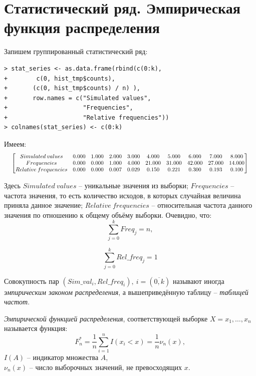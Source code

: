 \documentclass[14pt,a4paper]{scrartcl}
\begin{document}
\section{Статистический ряд. Эмпирическая функция распределения}
Запишем группированный статистический ряд:
\begin{lstlisting}
> stat_series <- as.data.frame(rbind(c(0:k), 
+        c(0, hist_tmp$counts), 
+       (c(0, hist_tmp$counts) / n) ), 
+       row.names = c("Simulated values", 
+                     "Frequencies", 
+                     "Relative frequencies"))
> colnames(stat_series) <- c(0:k)
\end{lstlisting}
Имеем:
\begin{equation*}
\resizebox{.98\hsize}{!}{$
	\begin{bmatrix}{}
	Simulated \: values & 0.000 & 1.000 & 2.000 & 3.000 & 4.000 & 5.000 & 6.000 & 7.000 & 8.000 \\ 
	Frequencies & 0.000 & 0.000 & 1.000 & 4.000 & 21.000 & 31.000 & 42.000 & 27.000 & 14.000 \\ 
	Relative \: frequencies & 0.000 & 0.000 & 0.007 & 0.029 & 0.150 & 0.221 & 0.300 & 0.193 & 0.100 \\ 
	\end{bmatrix}
$}
\end{equation*}

Здесь $Simulated \: values$ -- уникальные значения из выборки; $Frequencies$ -- частота значения, то есть количество исходов, в которых случайная величина приняла данное значение; $Relative \: frequencies$ -- относительная частота данного значения по отношению к общему объёму выборки. Очевидно, что:
\begin{equation*}
	\sum_{j = 0}^{k} Freq_j = n,
\end{equation*}

\begin{equation*}
	\sum_{j = 0}^{k} Rel\_freq_j = 1
\end{equation*}

Совокупность пар $(Sim\_val_i, Rel\_freq_i), \: i=(\overline{0, k})$ называют иногда \textit{эмпирическим законом распределения}, а вышеприведённую таблицу -- \textit{таблицей частот}.

\textit{Эмпирической функцией распределения}, соответствующей выборке $X = {x_1, \dots, x_n}$ называется функция:
\begin{equation*}
	F_n^* = \frac{1}{n} \sum_{i = 1}^{n} I(x_i < x) = \frac{1}{n} \nu_n(x),
\end{equation*} 
$I(A)$ -- индикатор множества $A$,\\
$\nu_n(x)$ -- число выборочных значений, не превосходящих $x$.
 
\end{document}
